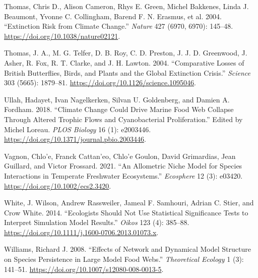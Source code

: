 \documentclass{article}
\newlength{\cslhangindent}
\newlength{\cslentryspacingunit} %
\newenvironment{CSLReferences}[2] %
 {%
  \setlength{\parindent}{0pt}
  \ifodd #1
  \let\oldpar\par
  \def\par{\hangindent=\cslhangindent\oldpar}
  \fi
  \setlength{\parskip}{#2\cslentryspacingunit}
 }%
 {}
\begin{document}
\begin{CSLReferences}{1}{0}
\leavevmode{}%
Thomas, Chris D., Alison Cameron, Rhys E. Green, Michel Bakkenes, Linda
J. Beaumont, Yvonne C. Collingham, Barend F. N. Erasmus, et al. 2004.
{``Extinction Risk from Climate Change.''} \emph{Nature} 427 (6970,
6970): 145--48. \url{https://doi.org/10.1038/nature02121}.

\leavevmode{}%
Thomas, J. A., M. G. Telfer, D. B. Roy, C. D. Preston, J. J. D.
Greenwood, J. Asher, R. Fox, R. T. Clarke, and J. H. Lawton. 2004.
{``Comparative {Losses} of {British Butterflies}, {Birds}, and {Plants}
and the {Global Extinction Crisis}.''} \emph{Science} 303 (5665):
1879--81. \url{https://doi.org/10.1126/science.1095046}.

\leavevmode{}%
Ullah, Hadayet, Ivan Nagelkerken, Silvan U. Goldenberg, and Damien A.
Fordham. 2018. {``Climate Change Could Drive Marine Food Web Collapse
Through Altered Trophic Flows and Cyanobacterial Proliferation.''}
Edited by Michel Loreau. \emph{PLOS Biology} 16 (1): e2003446.
\url{https://doi.org/10.1371/journal.pbio.2003446}.

\leavevmode{}%
Vagnon, Chlo'e, Franck Cattan'eo, Chlo'e Goulon, David Grimardias, Jean
Guillard, and Victor Frossard. 2021. {``An Allometric Niche Model for
Species Interactions in Temperate Freshwater Ecosystems.''}
\emph{Ecosphere} 12 (3): e03420.
\url{https://doi.org/10.1002/ecs2.3420}.

\leavevmode{}%
White, J. Wilson, Andrew Rassweiler, Jameal F. Samhouri, Adrian C.
Stier, and Crow White. 2014. {``Ecologists Should Not Use Statistical
Significance Tests to Interpret Simulation Model Results.''}
\emph{Oikos} 123 (4): 385--88.
\url{https://doi.org/10.1111/j.1600-0706.2013.01073.x}.

\leavevmode{}%
Williams, Richard J. 2008. {``Effects of Network and Dynamical Model
Structure on Species Persistence in Large Model Food Webs.''}
\emph{Theoretical Ecology} 1 (3): 141--51.
\url{https://doi.org/10.1007/s12080-008-0013-5}.

\end{CSLReferences}



\end{document}
